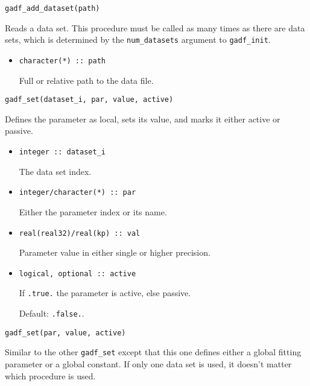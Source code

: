 \documentclass{article}
\begin{document}
\begin{verbatim}
gadf_add_dataset(path)
\end{verbatim}
Reads a data set. This procedure must be called as many times as there are data sets, which is determined by the \verb+num_datasets+ argument to \verb+gadf_init+.
\begin{itemize}
\item
\begin{verbatim}
character(*) :: path
\end{verbatim}
  Full or relative path to the data file.
\end{itemize}

\begin{verbatim}
gadf_set(dataset_i, par, value, active)
\end{verbatim}
Defines the parameter as local, sets its value, and marks it either active or passive.
\begin{itemize}
\item
\begin{verbatim}
integer :: dataset_i
\end{verbatim}
  The data set index.
\item
\begin{verbatim}
integer/character(*) :: par
\end{verbatim}
  Either the parameter index or its name.
\item
\begin{verbatim}
real(real32)/real(kp) :: val
\end{verbatim}
  Parameter value in either single or higher precision.
\item
\begin{verbatim}
logical, optional :: active
\end{verbatim}
  If \verb+.true.+ the parameter is active, else passive.

  Default: \verb+.false.+.
\end{itemize}

\begin{verbatim}
gadf_set(par, value, active)
\end{verbatim}
Similar to the other \verb+gadf_set+ except that this one defines either a global fitting parameter or a global constant. If only one data set is used, it doesn't matter which procedure is used.
\end{document}
